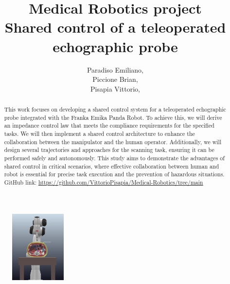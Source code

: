 \documentclass{article}
\author{Paradiso Emiliano,  \quad 1940454 \\Piccione Brian, \quad 1889051 \\Pisapia Vittorio,  \quad 1918590 }
\title{\Huge Medical Robotics project \\ \centering \Large \textbf{Shared control of a teleoperated echographic probe}}
\begin{document}
\date{}
\maketitle
\vspace{-1cm}

\begin{figure}[h]
    \centering
    \includegraphics[width=0.25\textwidth]{Approach.png}  
\end{figure}

\begin{abstract}
\hspace*{-0.5cm}This work focuses on developing a shared control system for a teleoperated echographic probe integrated with the Franka Emika Panda Robot. To achieve this, we will derive an impedance control law that meets the compliance requirements for the specified tasks. We will then implement a shared control architecture to enhance the collaboration between the manipulator and the human operator. Additionally, we will design several trajectories and approaches for the scanning task, ensuring it can be performed safely and autonomously. This study aims to demonstrate the advantages of shared control in critical scenarios, where effective collaboration between human and robot is essential for precise task execution and the prevention of hazardous situations.
\\GitHub link: \uline{\href{https://github.com/VittorioPisapia/Medical-Robotics/tree/main}{https://github.com/VittorioPisapia/Medical-Robotics/tree/main}}
\end{abstract}

\newpage
\tableofcontents
\newpage
\end{document}
